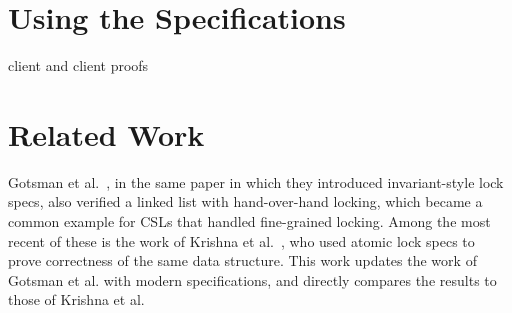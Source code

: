 \documentclass[runningheads]{llncs}
\newcommand{\treerep}{\ensuremath{\mathsf{bst\_abs}}}
\newcommand{\nodeboxrep}{\ensuremath{\mathsf{bst\_ref}}}
\newcommand{\ignore}[1]{}
\begin{document}
\ignore{\section{Lock-Free BST}
We want to prove that a lock-free BST implementation satisfies the same specification as our hand-over-hand implementation. Unfortunately, provably-correct deletion in a lock-free setting is a research topic in itself (cite?), so we begin with a lock-free BST that only supports insert and lookup. Once again, we want to prove
\begin{mathpar}
\forall t.\ \langle \nodeboxrep\ p\ |\ \treerep\ t\rangle\ \texttt{insert}(p, k, v)\ \langle \nodeboxrep\ p\ |\ \treerep\ (\mathrm{insert}\ t\ k\ v)\rangle

\forall t.\ \langle \nodeboxrep\ p\ |\ \treerep\ t\rangle\ \texttt{lookup}(p, k)\ \langle v.\ \nodeboxrep\ p\ |\ \treerep\ t \land \mathrm{lookup}\ t\ k = v\rangle
\end{mathpar}
though the precise definitions of $\nodeboxrep$ and $\treerep$ will differ. %
}

\section{Using the Specifications}
client and client proofs

\section{Related Work}
\label{related}
Gotsman et al.~\cite{gotsman}, in the same paper in which they introduced invariant-style lock specs, also verified a linked list with hand-over-hand locking, which became a common example for CSLs that handled fine-grained locking. Among the most recent of these is the work of Krishna et al.~\cite{templates}, who used atomic lock specs to prove correctness of the same data structure. This work updates the work of Gotsman et al. with modern specifications, and directly compares the results to those of Krishna et al. 

\end{document}
